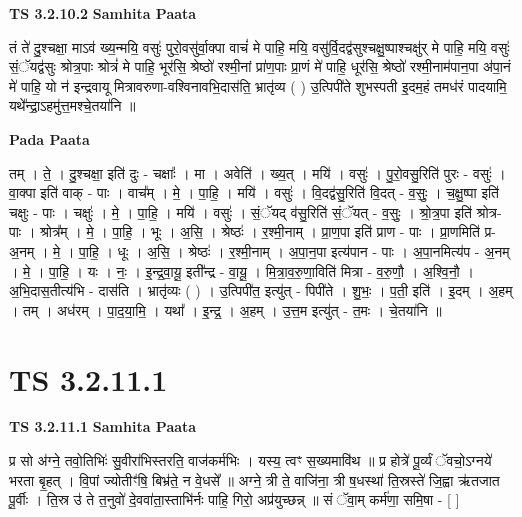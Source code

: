\documentclass[17pt]{extarticle}
\begin{document}
\textbf{TS 3.2.10.2 } \newline
\textbf{Samhita Paata} \newline

तं ते॑ दु॒श्चक्षा॒ माऽव॑ ख्य॒न्मयि॒ वसुः॑ पुरो॒वसु॑र्वा॒क्पा वाचं॑ मे पाहि॒ मयि॒ वसु॑र्वि॒दद्व॑सुश्चक्षु॒ष्पाश्चक्षु॑र् मे पाहि॒ मयि॒ वसुः॑ सं॒ॅयद्व॑सुः श्रोत्र॒पाः श्रोत्रं॑ मे पाहि॒ भूर॑सि॒ श्रेष्ठो॑ रश्मी॒नां प्रा॑ण॒पाः प्रा॒णं मे॑ पाहि॒ धूर॑सि॒ श्रेष्ठो॑ रश्मी॒नाम॑पान॒पा अ॑पा॒नं मे॑ पाहि॒ यो न॑ इन्द्रवायू मित्रावरुणा-वश्विनावभि॒दास॑ति॒ भ्रातृ॑व्य ( ) उ॒त्पिपी॑ते शुभस्पती इ॒दम॒हं तमध॑रं पादयामि॒ यथे᳚न्द्रा॒ऽहमु॑त्त॒मश्चे॒तया॑नि ॥ \newline

\textbf{Pada Paata} \newline

तम् । ते॒ । दु॒श्चक्षा॒ इति॑ दुः - चक्षाः᳚ । मा । अवेति॑ । ख्य॒त् । मयि॑ । वसुः॑ । पु॒रो॒वसु॒रिति॑ पुरः - वसुः॑ । वा॒क्पा इति॑ वाक् - पाः । वाच᳚म् । मे॒ । पा॒हि॒ । मयि॑ । वसुः॑ । वि॒दद्व॑सु॒रिति॑ वि॒दत् - व॒सुः॒ । च॒क्षु॒ष्पा इति॑ चक्षुः - पाः । चक्षुः॑ । मे॒ । पा॒हि॒ । मयि॑ । वसुः॑ । सं॒ॅयद् व॑सु॒रिति॑ सं॒ॅयत् - व॒सुः॒ । श्रो॒त्र॒पा इति॑ श्रोत्र-पाः । श्रोत्र᳚म् । मे॒ । पा॒हि॒ । भूः । अ॒सि॒ । श्रेष्ठः॑ । र॒श्मी॒नाम् । प्रा॒ण॒पा इति॑ प्राण - पाः । प्रा॒णमिति॑ प्र- अ॒नम् । मे॒ । पा॒हि॒ । धूः । अ॒सि॒ । श्रेष्ठः॑ । र॒श्मी॒नाम् । अ॒पा॒न॒पा इत्य॑पान - पाः । अ॒पा॒नमित्य॑प - अ॒नम् । मे॒ । पा॒हि॒ । यः । नः॒ । इ॒न्द्र॒वा॒यू॒ इती᳚न्द्र - वा॒यू॒ । मि॒त्रा॒व॒रु॒णा॒विति॑ मित्रा - व॒रु॒णौ॒ । अ॒श्वि॒नौ॒ । अ॒भि॒दास॒तीत्य॑भि - दास॑ति । भ्रातृ॑व्यः ( ) । उ॒त्पिपी॑त॒ इत्यु॑त् - पिपी॑ते । शु॒भः॒ । प॒ती॒ इति॑ । इ॒दम् । अ॒हम् । तम् । अध॑रम् । पा॒द॒या॒मि॒ । यथा᳚ । इ॒न्द्र॒ । अ॒हम् । उ॒त्त॒म इत्यु॑त् - त॒मः । चे॒तया॑नि ॥  \newline





\section{ TS 3.2.11.1 }

\textbf{TS 3.2.11.1 } \newline
\textbf{Samhita Paata} \newline

प्र सो अ॑ग्ने॒ तवो॒तिभिः॑ सु॒वीरा॑भिस्तरति॒ वाज॑कर्मभिः । यस्य॒ त्वꣳ स॒ख्यमावि॑थ ॥ प्र होत्रे॑ पू॒र्व्यं ॅवचो॒ऽग्नये॑ भरता बृ॒हत् । वि॒पां ज्योतीꣳ॑षि॒ बिभ्र॑ते॒ न वे॒धसे᳚ ॥ अग्ने॒ त्री ते॒ वाजि॑ना॒ त्री ष॒धस्था॑ ति॒स्रस्ते॑ जि॒ह्वा ऋ॑तजात पू॒र्वीः । ति॒स्र उ॑ ते त॒नुवो॑ दे॒ववा॑ता॒स्ताभि॑र्नः पाहि॒ गिरो॒ अप्र॑युच्छन्न् ॥ सं ॅवा॒म् कर्म॑णा॒ समि॒षा - [  ] \newline
\end{document}
